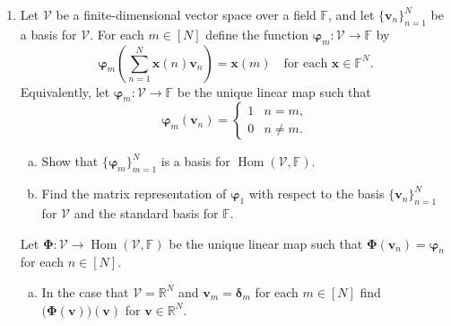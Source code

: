 \documentclass[12pt]{amsart}
\newcommand{\1}{\mathbbm{1}}
\numberwithin{equation}{section}
\numberwithin{Theorem}{section}
\theoremstyle{plain} %
\theoremstyle{definition}
\theoremstyle{remark}
\begin{document}
\begin{enumerate}[1.]
\clearpage

\item Let \(\mathcal{V}\) be a finite-dimensional vector space over a field \(\mathbb{F}\), and let \(\{\mathbf{v}_{n}\}_{n=1}^{N}\) be a basis for \(\mathcal{V}\). For each \(m\in[N]\) define the function \(\boldsymbol{\varphi}_{m}:\mathcal{V}\to\mathbb{F}\) by
\[\boldsymbol{\varphi}_{m}\left(\sum_{n=1}^{N}\mathbf{x}(n)\mathbf{v}_{n}\right) = \mathbf{x}(m)\quad\text{for each }\mathbf{x}\in\mathbb{F}^{N}.\]
Equivalently, let \(\boldsymbol{\varphi}_{m}:\mathcal{V}\to\mathbb{F}\) be the unique linear map such that
\[\boldsymbol{\varphi}_{m}(\mathbf{v}_{n}) = \begin{cases} 1 & n=m,\\ 0 & n\neq m.\end{cases}\]

\begin{enumerate}[(a)]

\item Show that \(\{\boldsymbol{\varphi}_{m}\}_{m=1}^{N}\) is a basis for \(\operatorname{Hom}(\mathcal{V},\mathbb{F})\).\medskip

\item Find the matrix representation of \(\boldsymbol{\varphi}_{1}\) with respect to the basis \(\{\mathbf{v}_{n}\}_{n=1}^{N}\) for \(\mathcal{V}\) and the standard basis for \(\mathbb{F}\).\medskip

\end{enumerate}

\noindent Let \(\mathbf{\Phi}:\mathcal{V}\to\operatorname{Hom}(\mathcal{V},\mathbb{F})\) be the unique linear map such that \(\mathbf{\Phi}(\mathbf{v}_{n}) = \boldsymbol{\varphi}_{n}\) for each \(n\in[N]\).\medskip

\begin{enumerate}[(a)]

\addtocounter{enumii}{2}

\item In the case that \(\mathcal{V}=\mathbb{R}^{N}\) and \(\mathbf{v}_{m}=\boldsymbol{\delta}_{m}\) for each \(m\in[N]\) find \(\big(\mathbf{\Phi}(\mathbf{v})\big)(\mathbf{v})\) for \(\mathbf{v}\in\mathbb{R}^{N}\). \medskip

\end{enumerate}


\end{enumerate}
\end{document}
